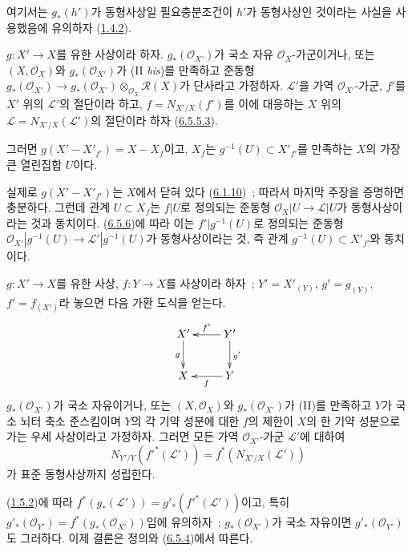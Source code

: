 여기서는 $g_*(h')$가 동형사상일 필요충분조건이 $h'$가 동형사상인
것이라는 사실을 사용했음에 유의하자
(\hyperref[II.1.4.2-ko]{1.4.2}).

\begin{corollary}[6.5.7]
\label{II.6.5.7-ko}
$g:X'\to X$를 유한 사상이라 하자. $g_*(\mathcal{O}_{X'})$가
국소 자유 $\mathcal{O}_X$-가군이거나, 또는 $(X,\mathcal{O}_X)$와
$g_*(\mathcal{O}_{X'})$가 (II \emph{bis})를 만족하고 준동형
$g_*(\mathcal{O}_{X'})\to
g_*(\mathcal{O}_{X'})\otimes_{\mathcal{O}_X}\mathcal{R}(X)$가
단사라고 가정하자. $\mathcal{L}'$을 가역 $\mathcal{O}_{X'}$-가군,
$f'$를 $X'$ 위의 $\mathcal{L}'$의 절단이라 하고,
$f=N_{X'/X}(f')$를 이에 대응하는 $X$ 위의
$\mathcal{L}=N_{X'/X}(\mathcal{L}')$의 절단이라 하자
(\hyperref[II.6.5.5.3-ko]{6.5.5.3}).


그러면 $g(X'-X'_{f'})=X-X_f$이고, $X_f$는
$g^{-1}(U)\subset X'_{f'}$를 만족하는 $X$의 가장 큰 열린집합 $U$이다.
\end{corollary}

실제로 $g(X'-X'_{f'})$는 $X$에서 닫혀 있다
(\hyperref[II.6.1.10-ko]{6.1.10})~; 따라서 마지막 주장을 증명하면
충분하다. 그런데 관계 $U\subset X_f$는 $f|U$로 정의되는 준동형
$\mathcal{O}_X|U\to\mathcal{L}|U$가 동형사상이라는 것과 동치이다.
(\hyperref[II.6.5.6-ko]{6.5.6})에 따라 이는 $f'|g^{-1}(U)$로 정의되는
준동형
$\mathcal{O}_{X'}|g^{-1}(U)\to\mathcal{L}'|g^{-1}(U)$가
동형사상이라는 것, 즉 관계 $g^{-1}(U)\subset X'_{f'}$와 동치이다.

\begin{proposition}[6.5.8]
\label{II.6.5.8-ko}
$g:X'\to X$를 유한 사상, $f:Y\to X$를 사상이라 하자~;
$Y'=X'_{(Y)}$, $g'=g_{(Y)}$, $f'=f_{(X')}$라 놓으면 다음 가환 도식을
얻는다.
\[
\xymatrix{
X'\ar[d]_g & Y'\ar[l]_{f'}\ar[d]^{g'}\\
X & Y\ar[l]^f
}
\]
$g_*(\mathcal{O}_{X'})$가 국소 자유이거나, 또는
$(X,\mathcal{O}_X)$와 $g_*(\mathcal{O}_{X'})$가 (II)를 만족하고
$Y$가 국소 뇌터 축소 준스킴이며 $Y$의 각 기약 성분에 대한 $f$의
제한이 $X$의 한 기약 성분으로 가는 우세 사상이라고 가정하자. 그러면
모든 가역 $\mathcal{O}_{X'}$-가군 $\mathcal{L}'$에 대하여
\[
N_{Y'/Y}({f'}^*(\mathcal{L}'))=f^*(N_{X'/X}(\mathcal{L}'))
\]
가 표준 동형사상까지 성립한다.
\end{proposition}

(\hyperref[II.1.5.2-ko]{1.5.2})에 따라
$f^*(g_*(\mathcal{L}'))=g'_*({f'}^*(\mathcal{L}'))$이고, 특히
$g'_*(\mathcal{O}_{Y'})=f^*(g_*(\mathcal{O}_{X'}))$임에 유의하자~;
$g_*(\mathcal{O}_{X'})$가 국소 자유이면
$g'_*(\mathcal{O}_{Y'})$도 그러하다. 이제 결론은 정의와
(\hyperref[II.6.5.4-ko]{6.5.4})에서 따른다.

